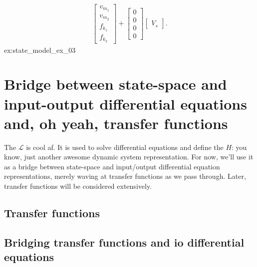\documentclass[dynamic_systems.tex]{subfiles}
\begin{document}
{\begin{align*}
	\begin{bmatrix}
		v_{m_1}\\v_{m_2}\\f_{k_1}\\f_{k_2}
	\end{bmatrix}
	+
	\begin{bmatrix}
		0 \\ 0 \\ 0 \\ 0
	\end{bmatrix}
	\begin{bmatrix}
		V_s
	\end{bmatrix}.
\end{align*}
}{%
ex:state_model_ex_03%
}

\section[Between state-space and io differential equations]{Bridge between state-space and input-output differential equations and, oh yeah, transfer functions}
\tags{}
\label{lec:bridge_state_space_to_io}

The  $\mathcal{L}$ is cool af.
It is used to solve differential equations and define the  $H$: you know, just another awesome dynamic system representation.
For now, we'll use it as a bridge between state-space and input/output differential equation representations, merely waving at transfer functions as we pass through.
Later, transfer functions will be considered extensively.
\tags{}


% 

\subsection{Transfer functions}
\tags{}


\subsection{Bridging transfer functions and io differential equations}
\tags{}

\end{document}
